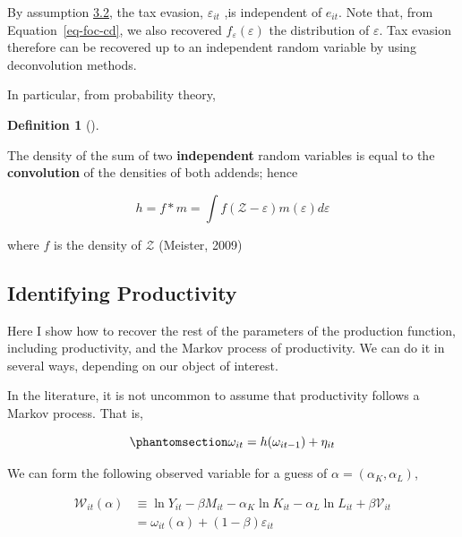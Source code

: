 \documentclass[
  12pt]{article}
\theoremstyle{definition}
\newtheorem{definition}{Definition}[section]
\theoremstyle{remark}
\newenvironment{fbx}[3]{\begin{tcolorbox}[enhanced, breakable,%
attach boxed title to top*={xshift=1.4pt},
boxed title style={boxrule=0.0mm, fuzzy shadow={1pt}{-1pt}{0mm}{0.1mm}{gray}, arc=.3em, rounded corners=east, sharp corners=west}, colframe=#1-color2, colbacktitle=#1-color1, colback = white, coltitle=black,  titlerule=0mm, toprule=0pt, bottomrule=.7pt, leftrule=.3em, rightrule=0pt, outer arc=.3em,  arc=0pt,	 sharp corners = east, left=.5em, bottomtitle=1mm, toptitle=1mm,title=\textbf{#2}\hspace{0.5em}{#3}]}
{\end{tcolorbox}}
\begin{document}
By assumption \hyperref[ass-ind]{3.2}, the tax evasion,
\(\varepsilon_{it}\) ,is independent of \(e_{it}\). Note that, from
Equation~\ref{eq-foc-cd}, we also recovered
\(f_{\varepsilon}(\varepsilon)\) the distribution of \(\varepsilon\).
Tax evasion therefore can be recovered up to an independent random
variable by using deconvolution methods.

In particular, from probability theory,

\begin{definition}[]\protect\hypertarget{def-conv}{}\label{def-conv}

\begin{fbx}{Definition}{Definition: }{Convolution}
\label{}
The density of the sum of two \textbf{independent} random variables is
equal to the \textbf{convolution} of the densities of both addends;
hence

\[
h = f*m = \int f(\mathcal Z - \varepsilon)m(\varepsilon)d\varepsilon
\]

where \(f\) is the density of \(\mathcal Z\) (Meister, 2009)

\end{fbx}

\end{definition}

\subsection{Identifying Productivity}\label{identifying-productivity}

Here I show how to recover the rest of the parameters of the production
function, including productivity, and the Markov process of
productivity. We can do it in several ways, depending on our object of
interest.

In the literature, it is not uncommon to assume that productivity
follows a Markov process. That is,

\begin{equation}\phantomsection\label{eq-prod-markov}{
    \omega_{it}=h(\omega_{it-1})+\eta_{it}
}\end{equation}

We can form the following observed variable for a guess of
\(\alpha=(\alpha_K,\alpha_L)\),

\[
\begin{aligned}
    \mathcal W_{it}(\alpha) & \equiv \ln Y_{it} - \beta M_{it}-\alpha_K \ln K_{it}-\alpha_L \ln L_{it}+\beta\mathcal{V}_{it}\\
    & = \omega_{it}(\alpha)+(1-\beta)\varepsilon_{it}
\end{aligned}
\]
\end{document}

